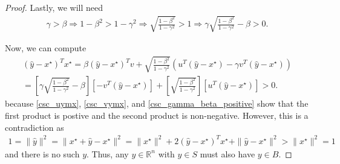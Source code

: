 \documentclass{article}
\theoremstyle{case}
\numberwithin{theorem}{subsection}
\newcommand{\Rn}{\mathbb R^n}
\begin{document}
\begin{proof}
Lastly, we will need
\begin{align}
\gamma > \beta 
\Longrightarrow 1 - \beta^2 > 1 - \gamma^2
\Longrightarrow \sqrt{\frac{1 - \beta^2}{1 - \gamma^2}} > 1
\Longrightarrow \gamma \sqrt{\frac{1 - \beta^2}{1 - \gamma^2}} - \beta > 0. \label{csc_gamma_beta_positive}
\end{align}

Now, we can compute
\begin{align*}
{\left(\hat y - x^{\star}\right)}^Tx^{\star} = 
\beta {\left(\hat y - x^{\star}\right)}^Tv
+ \sqrt{\frac{1 - \beta^2}{1 - \gamma^2}} 
\left(u^T\left(\hat y - x^{\star}\right) - \gamma v^T \left(\hat y - x^{\star}\right) \right)\\ 
= \left[\gamma \sqrt{\frac{1 - \beta^2}{1 - \gamma^2}} - \beta\right] \left[-v^T\left(\hat y - x^{\star}\right)\right]
+ \left[\sqrt{\frac{1 - \beta^2}{1 - \gamma^2}}\right] \left[u^T\left(\hat y - x^{\star}\right) \right] > 0.
\end{align*}
because \cref{csc_uymx}, \cref{csc_vymx}, and \cref{csc_gamma_beta_positive} show that the first product is postive and the second product is non-negative.
However, this is a contradiction as
\begin{align*}
1 = \|\hat y\|^2 = \|x^{\star} + \hat y - x^{\star}\|^2 = \|x^{\star}\|^2 + 2{\left(\hat y - x^{\star}\right)}^Tx^{\star} + \|\hat y - x^{\star}\|^2 > \|x^{\star}\|^2 = 1
\end{align*}
and there is no such $y$.
Thus, any $y \in\Rn$ with $y \in S$ must also have $y \in B$.
\end{proof}
\end{document}
